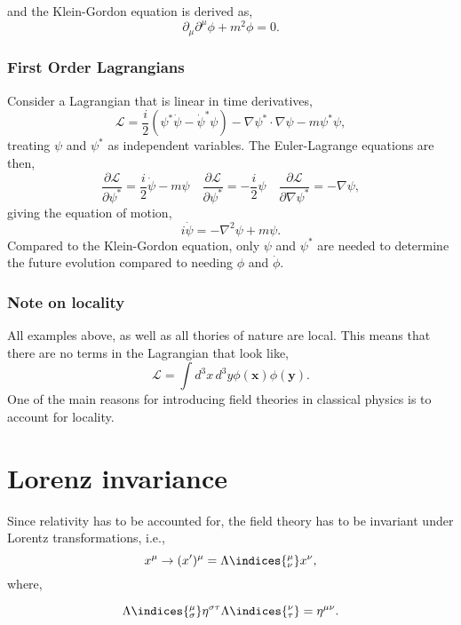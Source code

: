 and the Klein-Gordon equation is derived as,
\begin{equation}
  \partial_\mu \partial^\mu \phi + m^2\phi = 0. 
\end{equation}

\subsubsection{First Order Lagrangians}
Consider a Lagrangian that is linear in time derivatives, 
\begin{equation}
  \mathcal{L} = \frac{i}{2}(\psi^*\dot\psi - \dot\psi^*\psi) - \nabla\psi^*\cdot\nabla\psi - m\psi^*\psi,
\end{equation}
treating $\psi$ and $\psi^*$ as independent variables. The Euler-Lagrange equations are then,
\begin{equation}
  \frac{\partial\mathcal{L}}{\partial\psi^*} = \frac{i}{2}\dot\psi - m\psi \quad \frac{\partial\mathcal{L}}{\partial\psi^*} = -\frac{i}{2}\psi \quad \frac{\partial\mathcal{L}}{\partial\nabla\psi^*} = -\nabla\psi,
\end{equation}
giving the equation of motion, 
\begin{equation}
  i\dot\psi = -\nabla^2\psi +m\psi.
\end{equation}
Compared to the Klein-Gordon equation, only $\psi$ and $\psi^*$ are needed to determine the future evolution compared to needing $\phi$ and $\dot\phi$.

\subsubsection{Note on locality}
All examples above, as well as all thories of nature are local. This means that there are no terms in the Lagrangian that look like, 
\begin{equation}
  \mathcal{L} = \int d^3x\,d^3y\phi(\mathbf{x})\phi(\mathbf{y}). 
\end{equation}
One of the main reasons for introducing field theories in classical physics is to account for locality.

\section{Lorenz invariance}

Since relativity has to be accounted for, the field theory has to be invariant under Lorentz transformations, i.e., 
\begin{equation}
  x^\mu \rightarrow (x')^{\mu} = \Lambda\indices{^\mu_\nu}x^\nu,
\end{equation}
where, 
\begin{lemma}
  \begin{equation}
    \Lambda\indices{^\mu_\sigma}\eta^{\sigma\tau}\Lambda\indices{^\nu_\tau} = \eta^{\mu\nu}.
  \end{equation}
  \vspace{-0.5cm}
\end{lemma}

